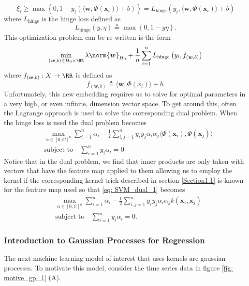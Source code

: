 \[
    \xi_i \geq \max \left\{ 0, 1 - y_i \left( \langle \bm{w} , \Phi \left( \bm{x}_i \right) \rangle + b \right)  \right\} = L_{\text{hinge}} \left( y_i , \langle \bm{w} , \Phi \left( \bm{x}_i \right) \rangle + b \right)
\]
where $L_{\text{hinge}}$ is the hinge loss defined as
\[
    L_{\text{hinge}} \left( y,\eta \right) \triangleq \max \left\{ 0,1-y\eta \right\}.
\]
This optimization problem can be re-written is the form
\[
    \min_{\left( \bm{w} , b \right) \in H_0 \times \RR} \lambda \norm{\bm{w}}_{H_0} + \frac{1}{n} \sum_{i=1}^{n} L_{\text{hinge}} \left( y_i , f_{\left( \bm{w} , b \right)} \right)
\]
where $f_{\left( \bm{w} , b \right)} : X \to \RR$ is defined as
\[
    f_{\left( \bm{w} , b \right)} \triangleq \langle \bm{w} , \Phi \left( x_i \right) \rangle + b.
\]
Unfortunately, this new embedding requires us to solve for optimal parameters in a very high, or even infinite, dimension vector space. To get around this, often the Lagrange approach is used to solve the corresponding dual problem. When the hinge loss is used the dual problem becomes
\begin{align} \label{eq: SVM_dual_1}
     & \max_{\alpha \in \left[ 0,C \right]^n} \sum_{i=1}^{n} \alpha_i - \frac{1}{2} \sum_{i,j=1}^{n} y_i y_j \alpha_i \alpha_j \langle \Phi \left( \bm{x}_i \right), \Phi \left( \bm{x}_j \right) \rangle \nonumber \\
     & \text{subject to} \quad \sum_{i=1}^{n} y_i \alpha_i = 0
\end{align}
Notice that in the dual problem, we find that inner products are only taken with vectors that have the feature map applied to them allowing us to employ the kernel if the corresponding kernel trick described in section \ref{Section1.1} is known for the feature map used so that \ref{eq: SVM_dual_1} becomes
\begin{align*}
     & \max_{\alpha \in \left[ 0,C \right]^n} \sum_{i=1}^{n} \alpha_i - \frac{1}{2} \sum_{i,j=1}^{n} y_i y_j \alpha_i \alpha_j k \left( \bm{x}_i, \bm{x}_j \right) \\
     & \text{subject to} \quad \sum_{i=1}^{n} y_i \alpha_i = 0.
\end{align*}

\subsubsection{Introduction to Gaussian Processes for Regression}\label{Section1.4.2}
The next machine learning model of interest that uses kernels are gaussian processes. To motivate this model, consider the time series data in figure \ref{fig: motive_gp_1} (A).


